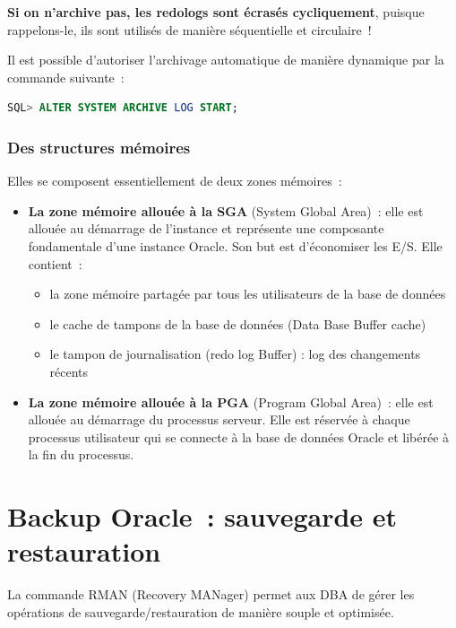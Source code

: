 \documentclass[12pt,a4paper]{report}
\begin{document}
\textbf{Si on n'archive pas, les redologs sont écrasés cycliquement}, puisque
rappelons-le, ils sont utilisés de manière séquentielle et circulaire~!

Il est possible d'autoriser l'archivage automatique de manière dynamique par la
commande suivante~:

\begin{lstlisting}[language=SQL]
SQL> ALTER SYSTEM ARCHIVE LOG START;
\end{lstlisting}

\subsubsection{Des structures mémoires}

Elles se composent essentiellement de deux zones mémoires~:

\begin{itemize}[leftmargin=*]
  \item \textbf{La zone mémoire allouée à la SGA} (System Global Area)~: elle
        est allouée au démarrage de l'instance et représente une composante
        fondamentale d'une instance Oracle. Son but est d'économiser les E/S.
        Elle contient~:
        \begin{itemize}[leftmargin=*]
          \item la zone mémoire partagée par tous les utilisateurs de la base
                de données
          \item le cache de tampons de la base de données (Data Base Buffer
                cache)
          \item le tampon de journalisation (redo log Buffer) : log des
                changements récents
        \end{itemize}
  \item \textbf{La zone mémoire allouée à la PGA} (Program Global Area)~: elle
        est allouée au démarrage du processus serveur. Elle est réservée à
        chaque processus utilisateur qui se connecte à la base de données Oracle
        et libérée à la fin du processus.
\end{itemize}

\section{Backup Oracle~: sauvegarde et restauration}

La commande RMAN (Recovery MANager) permet aux DBA de gérer les opérations de
sauvegarde/restauration de manière souple et optimisée.
\end{document}
